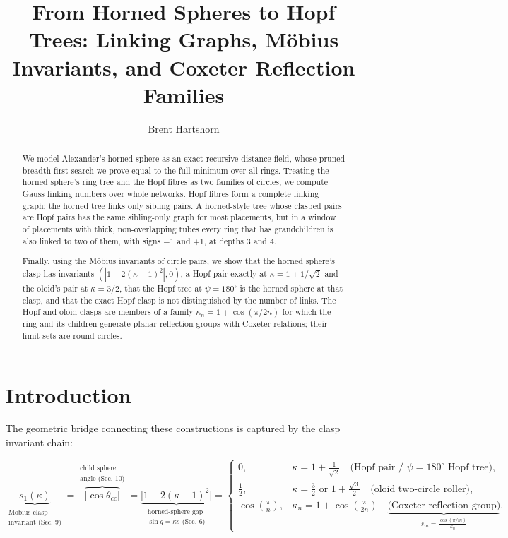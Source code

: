 \documentclass[11pt,a4paper]{article}
\title{From Horned Spheres to Hopf Trees: Linking Graphs, M\"obius Invariants, and Coxeter Reflection Families}
\author{Brent Hartshorn \orcidlink{0009-0004-2853-655X}}
\theoremstyle{remark}
\begin{document}
\maketitle

\begin{abstract}
We model Alexander's horned sphere as an exact recursive distance field, whose
pruned breadth-first search we prove equal to the full minimum over all rings.  
Treating the horned sphere's ring tree and the Hopf fibres as two families of circles, 
we compute Gauss linking numbers over whole networks.  
Hopf fibres form a complete linking graph; the horned tree links only sibling pairs.  
A horned-style tree whose clasped pairs are Hopf pairs has the same sibling-only graph for most placements, 
but in a window of placements with thick, 
non-overlapping tubes every ring that has grandchildren is also linked to two of them, with signs $-1$ and $+1$, at depths 3 and 4.  

Finally, using the M\"obius invariants of circle pairs, we show that the horned sphere's clasp has invariants $(|1-2(\kappa-1)^2|,0)$, a Hopf pair exactly at $\kappa=1+1/\sqrt2$ and the oloid's pair at $\kappa=3/2$, 
that the Hopf tree at $\psi=180^\circ$ is the horned sphere at that clasp, and that the exact Hopf clasp is not distinguished by the number of links.  The Hopf and oloid clasps are members of a family $\kappa_n=1+\cos(\pi/2n)$ for which the ring and its children generate planar reflection groups with Coxeter relations; their limit sets are round circles.
\end{abstract}

\section{Introduction}
The geometric bridge connecting these constructions is captured by the clasp invariant chain:
\begin{footnotesize}
\begin{equation}
\underbrace{s_1(\kappa)}_{\substack{\text{M\"obius clasp}\\\text{invariant (Sec.~9)}}}
= \overbrace{\bigl|\cos \theta_{cc}\bigr|}^{\substack{\text{child sphere}\\\text{angle (Sec.~10)}}}
= \underbrace{\bigl|1 - 2(\kappa - 1)^2\bigr|}_{\substack{\text{horned-sphere gap}\\\sin g = \kappa s \text{ (Sec.~6)}}}
= \begin{cases}
  0, & \kappa = 1 + \frac{1}{\sqrt{2}} \quad \text{(Hopf pair / }\psi = 180^\circ\text{ Hopf tree)}, \\[6pt]
  \frac{1}{2}, & \kappa = \frac{3}{2} \text{ or } 1 + \frac{\sqrt{3}}{2} \quad \text{(oloid two-circle roller)}, \\[6pt]
  \cos\!\left(\frac{\pi}{n}\right), & \kappa_n = 1 + \cos\!\left(\frac{\pi}{2n}\right) \quad \underbrace{\text{(Coxeter reflection group)}}_{s_m = \frac{\cos(\pi/m)}{\kappa_n}}.
\end{cases}
\end{equation}
\end{footnotesize}
\end{document}
